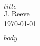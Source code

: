\documentclass[12pt]{article}
\begin{document}
\begin{center}
  \Large \textbf{$title$} \\
  \vspace{0.1in}
  \normalsize J. Reeve \\
  \today
\end{center}

$body$
\end{document}

